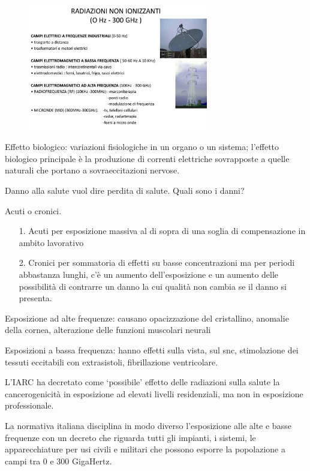 \begin{figure}[!ht]
\centering
	\includegraphics[width=0.7\textwidth]{24/image5.jpeg}
	\end{figure}

Effetto biologico: variazioni fisiologiche in un organo o un sistema;
l'effetto biologico principale è la produzione di correnti elettriche
sovrapposte a quelle naturali che portano a sovraeccitazioni nervose.

Danno alla salute vuol dire perdita di salute. Quali sono i danni?

Acuti o cronici.

\begin{itemize}
\item[1.]
  Acuti per esposizione massiva al di sopra di una soglia di
  compensazione in ambito lavorativo
\item[2.]
  Cronici per sommatoria di effetti su basse concentrazioni ma per
  periodi abbastanza lunghi, c'è un aumento dell'esposizione e un
  aumento delle possibilità di contrarre un danno la cui qualità non
  cambia se il danno si presenta.
\end{itemize}

Esposizione ad alte frequenze: causano opacizzazione del cristallino,
anomalie della cornea, alterazione delle funzioni muscolari neurali

Esposizioni a bassa frequenza: hanno effetti sulla vista, sul snc,
stimolazione dei tessuti eccitabili con extrasistoli, fibrillazione
ventricolare.

L'IARC ha decretato come `possibile' effetto delle radiazioni sulla
salute la cancerogenicità in esposizione ad elevati livelli
residenziali, ma non in esposizione professionale.

La normativa italiana disciplina in modo diverso l'esposizione alle alte
e basse frequenze con un decreto che riguarda tutti gli impianti, i
sistemi, le apparecchiature per usi civili e militari che possono
esporre la popolazione a campi tra 0 e 300 GigaHertz.

